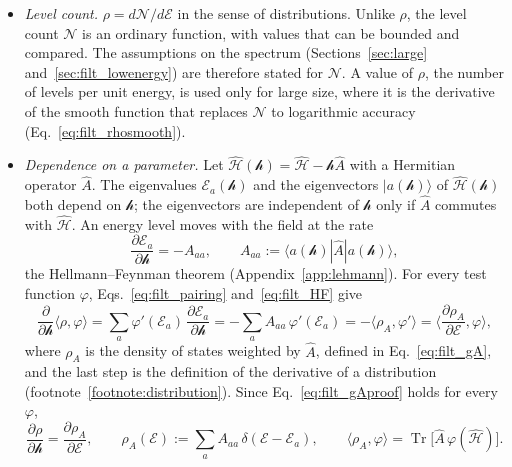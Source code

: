 \documentclass[10pt,a4paper]{article}
\theoremstyle{plain}
\newcommand{\Tr}{\operatorname{Tr}}
\newcommand{\cN}{\mathcal{N}}   %
\newcommand{\hfield}{\mathscr{h}}  %
\newcommand{\enrg}{\mathcal{E}}  %
\begin{document}
\begin{itemize}\setlength{\itemsep}{2pt}
\item \emph{Level count.} $\rho=d\cN/d\enrg$ in the sense of distributions.
  Unlike $\rho$, the level count $\cN$ is an ordinary function, with values
  that can be bounded and compared. The assumptions on the spectrum
  (Sections~\ref{sec:large} and~\ref{sec:filt_lowenergy}) are therefore
  stated for $\cN$. A value of $\rho$, the number of levels per unit energy,
  is used only for large size, where it is the derivative of the smooth
  function that replaces $\cN$ to logarithmic accuracy
  (Eq.~\eqref{eq:filt_rhosmooth}).
\item \emph{Dependence on a parameter.} Let
  $\hat{\mathcal H}(\hfield)=\hat{\mathcal H}-\hfield\hat A$ with a Hermitian
  operator $\hat A$. The eigenvalues $\enrg_a(\hfield)$ and the eigenvectors
  $|a(\hfield)\rangle$ of $\hat{\mathcal H}(\hfield)$ both depend on
  $\hfield$; the eigenvectors are independent of $\hfield$ only if $\hat A$
  commutes with $\hat{\mathcal H}$. An energy level moves with the field at
  the rate
  \begin{equation}\label{eq:filt_HF}
    \frac{\partial\enrg_a}{\partial\hfield}=-A_{aa} ,
    \qquad
    A_{aa}:=\langle a(\hfield)|\hat A|a(\hfield)\rangle ,
  \end{equation}
  the Hellmann--Feynman theorem (Appendix~\ref{app:lehmann}). For every test
  function $\varphi$, Eqs.~\eqref{eq:filt_pairing} and~\eqref{eq:filt_HF}
  give
  \begin{equation}\label{eq:filt_gAproof}
    \frac{\partial}{\partial\hfield}\langle\rho,\varphi\rangle
    =\sum_a\varphi'(\enrg_a)\,\frac{\partial\enrg_a}{\partial\hfield}
    =-\sum_aA_{aa}\,\varphi'(\enrg_a)
    =-\langle\rho_A,\varphi'\rangle
    =\Big\langle\frac{\partial\rho_A}{\partial\enrg},\varphi\Big\rangle ,
  \end{equation}
  where $\rho_A$ is the density of states weighted by $\hat A$, defined in
  Eq.~\eqref{eq:filt_gA}, and the last step is the definition of the
  derivative of a distribution (footnote~\ref{footnote:distribution}). Since
  Eq.~\eqref{eq:filt_gAproof} holds for every $\varphi$,
  \begin{equation}\label{eq:filt_gA}
    \frac{\partial \rho}{\partial \hfield}=\frac{\partial \rho_A}{\partial\enrg} ,
    \qquad
    \rho_A(\enrg):=\sum_aA_{aa}\,\delta(\enrg-\enrg_a) ,
    \qquad
    \langle \rho_A,\varphi\rangle=\Tr\big[\hat A\,\varphi(\hat{\mathcal H})\big] .
  \end{equation}

\end{itemize}
\end{document}

